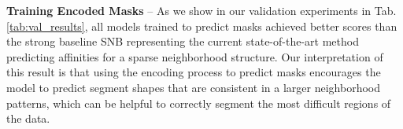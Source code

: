 \textbf{Training Encoded Masks} -- As we show in our validation experiments in Tab. \ref{tab:val_results}, all models trained to predict \maskname masks achieved better scores than the strong baseline SNB representing the current state-of-the-art method predicting affinities for a sparse neighborhood structure. 
Our interpretation of this result is that using the encoding process to predict \maskname masks encourages the model to predict segment shapes that are consistent in a larger neighborhood patterns, which can be helpful to correctly segment the most difficult regions of the data. \\

